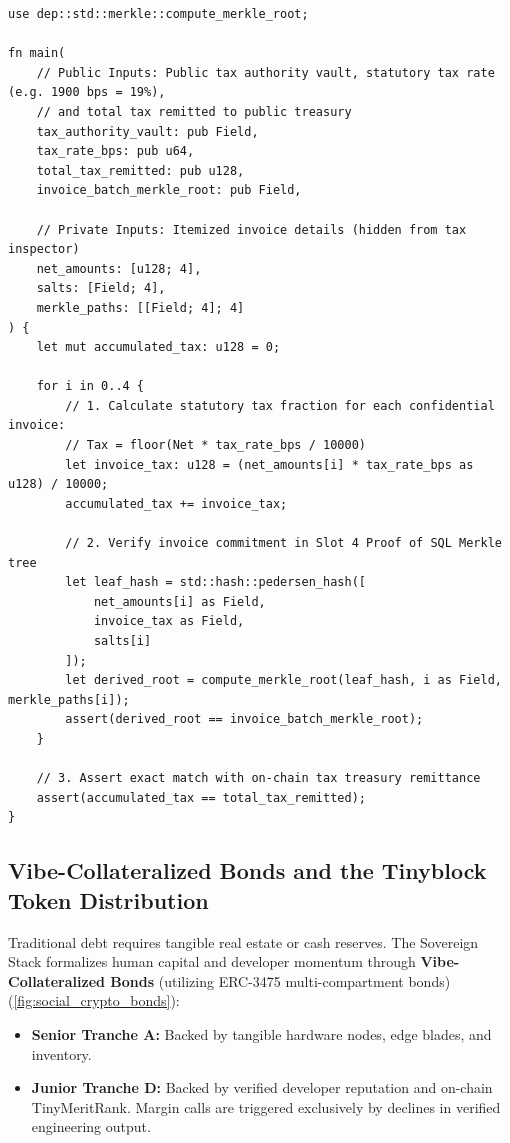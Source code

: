 \documentclass[a4paper,11pt,twoside,parskip=half-,headings=small]{scrartcl}
\newcommand{\code}[1]{\texttt{#1}}
\begin{document}
\begin{lstlisting}[language=Noir,caption={Noir Circuit: Zero-Knowledge Value-Added Tax (VAT) Compliance Verifier (\code{circuits/src/zk\_tax\_compliance.nr})}]
use dep::std::merkle::compute_merkle_root;

fn main(
    // Public Inputs: Public tax authority vault, statutory tax rate (e.g. 1900 bps = 19%),
    // and total tax remitted to public treasury
    tax_authority_vault: pub Field,
    tax_rate_bps: pub u64,
    total_tax_remitted: pub u128,
    invoice_batch_merkle_root: pub Field,
    
    // Private Inputs: Itemized invoice details (hidden from tax inspector)
    net_amounts: [u128; 4],
    salts: [Field; 4],
    merkle_paths: [[Field; 4]; 4]
) {
    let mut accumulated_tax: u128 = 0;

    for i in 0..4 {
        // 1. Calculate statutory tax fraction for each confidential invoice:
        // Tax = floor(Net * tax_rate_bps / 10000)
        let invoice_tax: u128 = (net_amounts[i] * tax_rate_bps as u128) / 10000;
        accumulated_tax += invoice_tax;

        // 2. Verify invoice commitment in Slot 4 Proof of SQL Merkle tree
        let leaf_hash = std::hash::pedersen_hash([
            net_amounts[i] as Field,
            invoice_tax as Field,
            salts[i]
        ]);
        let derived_root = compute_merkle_root(leaf_hash, i as Field, merkle_paths[i]);
        assert(derived_root == invoice_batch_merkle_root);
    }

    // 3. Assert exact match with on-chain tax treasury remittance
    assert(accumulated_tax == total_tax_remitted);
}
\end{lstlisting}

\subsection{Vibe-Collateralized Bonds and the Tinyblock Token Distribution}
\label{sec:social_crypto_bonds}

Traditional debt requires tangible real estate or cash reserves. The Sovereign Stack
formalizes human capital and developer momentum through \textbf{Vibe-Collateralized Bonds}
(utilizing ERC-3475 multi-compartment bonds) (\cref{fig:social_crypto_bonds}):
\begin{itemize}
  \item \textbf{Senior Tranche A:} Backed by tangible hardware nodes, edge blades, and inventory.
  \item \textbf{Junior Tranche D:} Backed by verified developer reputation and on-chain TinyMeritRank.
Margin calls are triggered exclusively by declines in verified engineering output.
\end{itemize}
\end{document}
